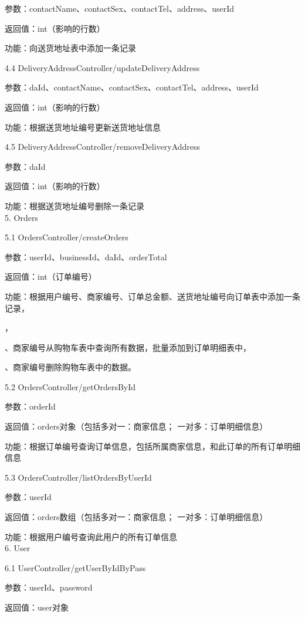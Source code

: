 参数：contactName、contactSex、contactTel、address、userId 

返回值：int（影响的行数）

功能：向送货地址表中添加一条记录

4.4 DeliveryAddressController/updateDeliveryAddress

参数：daId、contactName、contactSex、contactTel、address、userId

返回值：int（影响的行数）

功能：根据送货地址编号更新送货地址信息

4.5 DeliveryAddressController/removeDeliveryAddress 

参数：daId 

返回值：int（影响的行数）

功能：根据送货地址编号删除一条记录~\\

5. Orders

5.1 OrdersController/createOrders 

参数：userId、businessId、daId、orderTotal 

返回值：int（订单编号）

功能：根据用户编号、商家编号、订单总金额、送货地址编号向订单表中添加一条记录，

\qquad{}，

\qquad{}、商家编号从购物车表中查询所有数据，批量添加到订单明细表中，

\qquad{}、商家编号删除购物车表中的数据。

5.2 OrdersController/getOrdersById 

参数：orderId 

返回值：orders对象（包括多对一：商家信息； 一对多：订单明细信息）

功能：根据订单编号查询订单信息，包括所属商家信息，和此订单的所有订单明细信息

5.3 OrdersController/listOrdersByUserId 

参数：userId 

返回值：orders数组（包括多对一：商家信息； 一对多：订单明细信息）

功能：根据用户编号查询此用户的所有订单信息~\\

6. User

6.1 UserController/getUserByIdByPass 

参数：userId、password 

返回值：user对象

